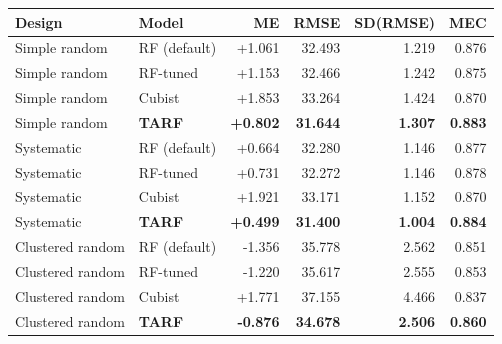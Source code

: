 \begin{tabular}{llrrrr}
\toprule
Design & Model & ME & RMSE & SD(RMSE) & MEC \\
\midrule
Simple random & RF (default) & +1.061 & 32.493 & 1.219 & 0.876 \\
Simple random & RF-tuned & +1.153 & 32.466 & 1.242 & 0.875 \\
Simple random & Cubist & +1.853 & 33.264 & 1.424 & 0.870 \\
Simple random & \textbf{TARF} & \textbf{+0.802} & \textbf{31.644} & \textbf{1.307} & \textbf{0.883} \\
\midrule
Systematic & RF (default) & +0.664 & 32.280 & 1.146 & 0.877 \\
Systematic & RF-tuned & +0.731 & 32.272 & 1.146 & 0.878 \\
Systematic & Cubist & +1.921 & 33.171 & 1.152 & 0.870 \\
Systematic & \textbf{TARF} & \textbf{+0.499} & \textbf{31.400} & \textbf{1.004} & \textbf{0.884} \\
\midrule
Clustered random & RF (default) & -1.356 & 35.778 & 2.562 & 0.851 \\
Clustered random & RF-tuned & -1.220 & 35.617 & 2.555 & 0.853 \\
Clustered random & Cubist & +1.771 & 37.155 & 4.466 & 0.837 \\
Clustered random & \textbf{TARF} & \textbf{-0.876} & \textbf{34.678} & \textbf{2.506} & \textbf{0.860} \\
\bottomrule
\end{tabular}

